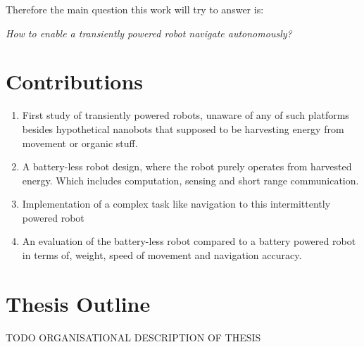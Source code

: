 
Therefore the main question this work will try to answer is:

\begin{center}
	\textit{How to enable a transiently powered robot navigate autonomously?}
\end{center}

\section{Contributions}

\begin{enumerate}

\item First study of transiently powered robots, unaware of any of such platforms besides hypothetical nanobots that supposed to be harvesting energy from movement or organic stuff.

\item A battery-less robot design, where the robot purely operates from harvested energy. Which includes computation, sensing and short range communication.

\item Implementation of a complex task like navigation to this intermittently powered robot

\item An evaluation of the battery-less robot compared to a battery powered robot in terms of, weight, speed of movement and navigation accuracy.
\end{enumerate}


\section{Thesis Outline}


\vspace{1\baselineskip}

\noindent
TODO ORGANISATIONAL DESCRIPTION OF THESIS

